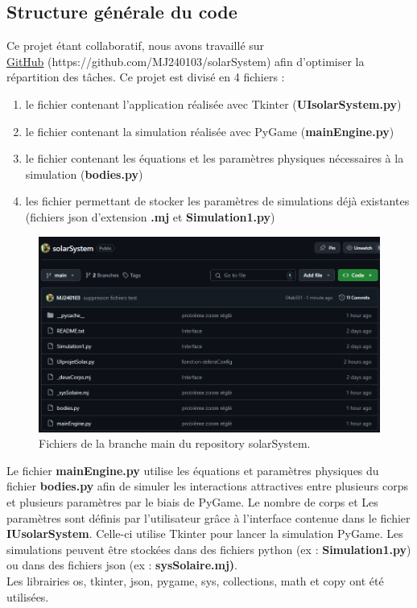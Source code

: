 \documentclass[a4paper, 12pt]{article}
\begin{document}
\subsection{Structure générale du code}
	Ce projet étant collaboratif, nous avons travaillé sur\\ \href{https://github.com/MJ240103/solarSystem}{GitHub} (https://github.com/MJ240103/solarSystem) afin d'optimiser la répartition des tâches. Ce projet est divisé en 4 fichiers : \\
    \begin{enumerate}
        \item le fichier contenant l'application réalisée avec Tkinter (\textbf{UIsolarSystem.py})
        \item le fichier contenant la simulation réalisée avec PyGame (\textbf{mainEngine.py})
        \item le fichier contenant les équations et les paramètres physiques nécessaires à la simulation (\textbf{bodies.py})
        \item les fichier permettant de stocker les paramètres de simulations déjà existantes (fichiers json d'extension \textbf{.mj} et \textbf{Simulation1.py})
    \end{enumerate}
    \begin{figure}[H]
        \centering
        \includegraphics[width=0.45\linewidth]{img/imgGitHub.png}
        \caption{\label{fig:Git}Fichiers de la branche main du repository solarSystem.}
    \end{figure} 
     
	Le fichier \textbf{mainEngine.py} utilise les équations et paramètres physiques du fichier \textbf{bodies.py} afin de simuler les interactions attractives entre plusieurs corps et plusieurs paramètres par le biais de PyGame. Le nombre de corps et Les paramètres sont définis par l'utilisateur grâce à l'interface contenue dans le fichier \textbf{IUsolarSystem}. Celle-ci utilise Tkinter pour lancer la simulation PyGame. Les simulations peuvent être stockées dans des fichiers python (ex : \textbf{Simulation1.py}) ou dans des fichiers json (ex : \textbf{sysSolaire.mj)}. \\
    Les librairies os, tkinter, json, pygame, sys, collections, math et copy ont été utilisées.
%
%
%
\newpage
\end{document}
